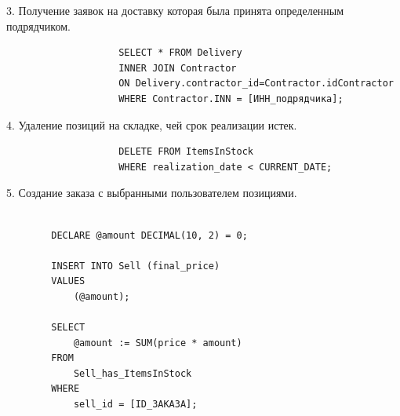 \documentclass[14pt]{extreport}
\begin{document}
        3. Получение заявок на доставку которая была принята определенным подрядчиком.
            
                \begin{verbatim}
                    SELECT * FROM Delivery
                    INNER JOIN Contractor
                    ON Delivery.contractor_id=Contractor.idContractor
                    WHERE Contractor.INN = [ИНН_подрядчика];
                \end{verbatim}
            
        
        4. Удаление позиций на складке, чей срок реализации истек.
            \begin{center}
                \begin{verbatim}
                    DELETE FROM ItemsInStock
                    WHERE realization_date < CURRENT_DATE;
                \end{verbatim}
            \end{center}
        
        
        5. Создание заказа с выбранными пользователем позициями.

        \begin{verbatim}

        DECLARE @amount DECIMAL(10, 2) = 0;

        INSERT INTO Sell (final_price) 
        VALUES 
            (@amount);

        SELECT 
            @amount := SUM(price * amount) 
        FROM 
            Sell_has_ItemsInStock 
        WHERE 
            sell_id = [ID_ЗАКАЗА];

        \end{verbatim}
\end{document}

